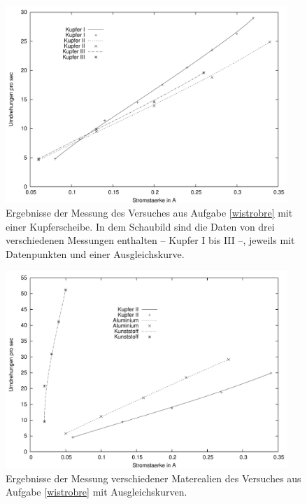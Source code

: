 \begin{figure}[htb]
	\centering
		\includegraphics[width=0.95\textwidth]{praktika/mat_praktika/b2}
	\caption{Ergebnisse der Messung des Versuches aus Aufgabe \ref{wistrobre} mit einer Kupferscheibe. In dem Schaubild sind die Daten von drei verschiedenen Messungen enthalten -- Kupfer I bis III --, jeweils mit Datenpunkten und einer Ausgleichskurve.}
	\label{abbkup1a}
\end{figure}


\begin{figure}[htb]
	\centering
		\includegraphics[width=0.95\textwidth]{praktika/mat_praktika/p1db1}
	\caption{Ergebnisse der Messung verschiedener Materealien des Versuches aus Aufgabe \ref{wistrobre} mit Ausgleichskurven.}
\label{verschmat}
\end{figure}


